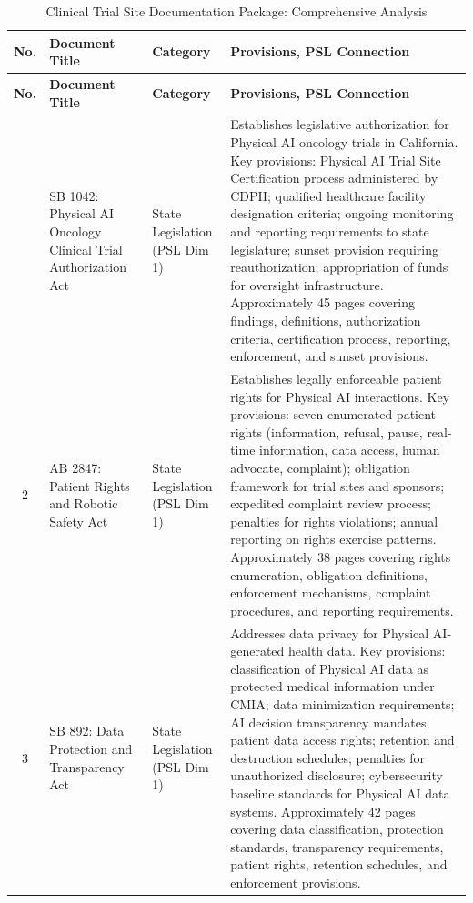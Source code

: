 \begin{longtable}{c >{\raggedright\arraybackslash}p{4.5cm} >{\raggedright\arraybackslash}p{3cm} >{\raggedright\arraybackslash}p{6.5cm}}
\caption{Clinical Trial Site Documentation Package: Comprehensive Analysis}
\label{tab:site-docs-comprehensive} \\
\toprule
\textbf{No.} & \textbf{Document Title} & \textbf{Category} & \textbf{Provisions, PSL Connection} \\
\midrule
\endfirsthead
\toprule
\textbf{No.} & \textbf{Document Title} & \textbf{Category} & \textbf{Provisions, PSL Connection} \\
\midrule
\endhead
\bottomrule
\endfoot
1 & SB 1042: Physical AI Oncology Clinical Trial Authorization Act & State Legislation (PSL Dim 1) & Establishes legislative authorization for Physical AI oncology trials in California. Key provisions: Physical AI Trial Site Certification process administered by CDPH; qualified healthcare facility designation criteria; ongoing monitoring and reporting requirements to state legislature; sunset provision requiring reauthorization; appropriation of funds for oversight infrastructure. Approximately 45 pages covering findings, definitions, authorization criteria, certification process, reporting, enforcement, and sunset provisions. \\
2 & AB 2847: Patient Rights and Robotic Safety Act & State Legislation (PSL Dim 1) & Establishes legally enforceable patient rights for Physical AI interactions. Key provisions: seven enumerated patient rights (information, refusal, pause, real-time information, data access, human advocate, complaint); obligation framework for trial sites and sponsors; expedited complaint review process; penalties for rights violations; annual reporting on rights exercise patterns. Approximately 38 pages covering rights enumeration, obligation definitions, enforcement mechanisms, complaint procedures, and reporting requirements. \\
3 & SB 892: Data Protection and Transparency Act & State Legislation (PSL Dim 1) & Addresses data privacy for Physical AI-generated health data. Key provisions: classification of Physical AI data as protected medical information under CMIA; data minimization requirements; AI decision transparency mandates; patient data access rights; retention and destruction schedules; penalties for unauthorized disclosure; cybersecurity baseline standards for Physical AI data systems. Approximately 42 pages covering data classification, protection standards, transparency requirements, patient rights, retention schedules, and enforcement provisions. \\

\end{longtable}

